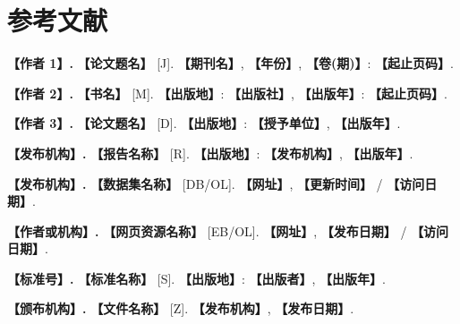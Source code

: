 
\section{参考文献}


\begin{enumerate}[label={[\arabic*]}, leftmargin=2em]
  \item \textbf{【作者 1】.} \textbf{【论文题名】} [J]. \textbf{【期刊名】}, \textbf{【年份】}, \textbf{【卷(期)】}: \textbf{【起止页码】}.
  \item \textbf{【作者 2】.} \textbf{【书名】} [M]. \textbf{【出版地】}: \textbf{【出版社】}, \textbf{【出版年】}: \textbf{【起止页码】}.
  \item \textbf{【作者 3】.} \textbf{【论文题名】} [D]. \textbf{【出版地】}: \textbf{【授予单位】}, \textbf{【出版年】}.
  \item \textbf{【发布机构】.} \textbf{【报告名称】} [R]. \textbf{【出版地】}: \textbf{【发布机构】}, \textbf{【出版年】}.
  \item \textbf{【发布机构】.} \textbf{【数据集名称】} [DB/OL]. \textbf{【网址】}, \textbf{【更新时间】} / \textbf{【访问日期】}.
  \item \textbf{【作者或机构】.} \textbf{【网页资源名称】} [EB/OL]. \textbf{【网址】}, \textbf{【发布日期】} / \textbf{【访问日期】}.
  \item \textbf{【标准号】.} \textbf{【标准名称】} [S]. \textbf{【出版地】}: \textbf{【出版者】}, \textbf{【出版年】}.
  \item \textbf{【颁布机构】.} \textbf{【文件名称】} [Z]. \textbf{【发布机构】}, \textbf{【发布日期】}.
\end{enumerate}


